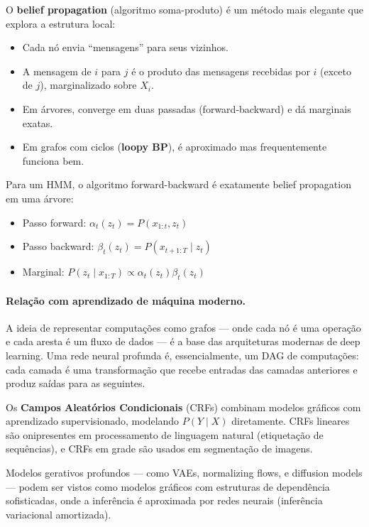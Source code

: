 \documentclass{tufte-handout}
\begin{document}
O \textbf{belief propagation} (algoritmo soma-produto) é um método mais elegante que explora a estrutura local:
\begin{itemize}
    \item Cada nó envia ``mensagens'' para seus vizinhos.
    \item A mensagem de $i$ para $j$ é o produto das mensagens recebidas por $i$ (exceto de $j$), marginalizado sobre $X_i$.
    \item Em árvores, converge em duas passadas (forward-backward) e dá marginais exatas.
    \item Em grafos com ciclos (\textbf{loopy BP}), é aproximado mas frequentemente funciona bem.
\end{itemize}

\begin{exmp}
    Para um HMM, o algoritmo forward-backward é exatamente belief propagation em uma árvore:
    \begin{itemize}
        \item Passo forward: $\alpha_t(z_t) = P(x_{1:t}, z_t)$
        \item Passo backward: $\beta_t(z_t) = P(x_{t+1:T} \mid z_t)$
        \item Marginal: $P(z_t \mid x_{1:T}) \propto \alpha_t(z_t) \beta_t(z_t)$
    \end{itemize}
\end{exmp}

\paragraph{Relação com aprendizado de máquina moderno.}

A ideia de representar computações como grafos --- onde cada nó é uma operação e cada aresta é um fluxo de dados --- é a base das arquiteturas modernas de deep learning. Uma rede neural profunda é, essencialmente, um DAG de computações: cada camada é uma transformação que recebe entradas das camadas anteriores e produz saídas para as seguintes.

Os \textbf{Campos Aleatórios Condicionais} (CRFs) combinam modelos gráficos com aprendizado supervisionado, modelando $P(Y \mid X)$ diretamente. CRFs lineares são onipresentes em processamento de linguagem natural (etiquetação de sequências), e CRFs em grade são usados em segmentação de imagens.

Modelos gerativos profundos --- como VAEs, normalizing flows, e diffusion models --- podem ser vistos como modelos gráficos com estruturas de dependência sofisticadas, onde a inferência é aproximada por redes neurais (inferência variacional amortizada).
\end{document}
